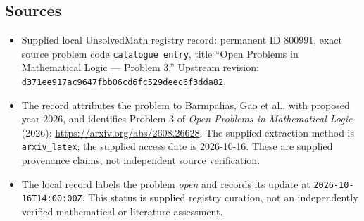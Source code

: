 \documentclass[11pt]{article}
\begin{document}
\subsection{Sources}
\begin{itemize}
\item Supplied local UnsolvedMath registry record: permanent ID $800991$, exact source problem code \texttt{catalogue entry}, title ``Open Problems in Mathematical Logic --- Problem 3.'' Upstream revision: \texttt{d371ee917ac9647fbb06cd6fc529deec6f3dda82}.
\item The record attributes the problem to Barmpalias, Gao et al., with proposed year $2026$, and identifies Problem 3 of \emph{Open Problems in Mathematical Logic} (2026): \url{https://arxiv.org/abs/2608.26628}. The supplied extraction method is \texttt{arxiv\_latex}; the supplied access date is 2026-10-16. These are supplied provenance claims, not independent source verification.
\item The local record labels the problem \emph{open} and records its update at \texttt{2026-10-16T14:00:00Z}. This status is supplied registry curation, not an independently verified mathematical or literature assessment.
\end{itemize}
\end{document}
